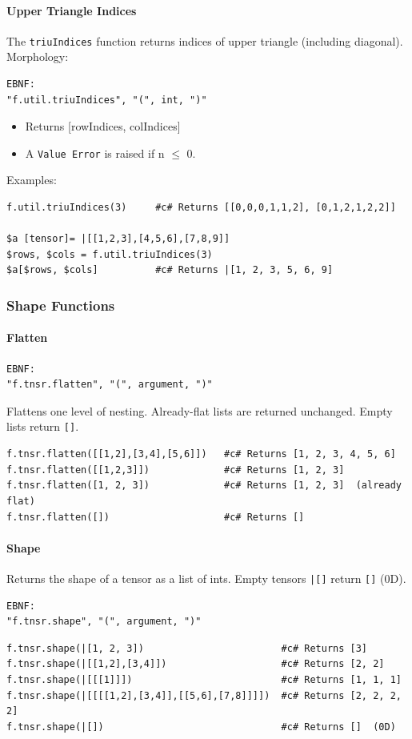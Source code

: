 \paragraph{Upper Triangle Indices}
The \texttt{triuIndices} function returns indices of upper triangle (including diagonal).\\
Morphology:
\begin{verbatim}
EBNF:
"f.util.triuIndices", "(", int, ")"
\end{verbatim}
\begin{itemize}
\item Returns [rowIndices, colIndices]
\item A \texttt{Value Error} is raised if n $\leq$ 0.
\end{itemize}
Examples:
\begin{verbatim}
f.util.triuIndices(3)     #c# Returns [[0,0,0,1,1,2], [0,1,2,1,2,2]]

$a [tensor]= |[[1,2,3],[4,5,6],[7,8,9]]
$rows, $cols = f.util.triuIndices(3)
$a[$rows, $cols]          #c# Returns |[1, 2, 3, 5, 6, 9]
\end{verbatim}

\subsubsection{Shape Functions}
\paragraph{Flatten}
\begin{verbatim}
EBNF:
"f.tnsr.flatten", "(", argument, ")"
\end{verbatim}
Flattens one level of nesting. Already-flat lists are returned unchanged. Empty lists return \texttt{[]}.
\begin{verbatim}
f.tnsr.flatten([[1,2],[3,4],[5,6]])   #c# Returns [1, 2, 3, 4, 5, 6]
f.tnsr.flatten([[1,2,3]])             #c# Returns [1, 2, 3]
f.tnsr.flatten([1, 2, 3])             #c# Returns [1, 2, 3]  (already flat)
f.tnsr.flatten([])                    #c# Returns []
\end{verbatim}

\paragraph{Shape}
Returns the shape of a tensor as a list of ints. Empty tensors \texttt{|[]} return \texttt{[]} (0D).
\begin{verbatim}
EBNF:
"f.tnsr.shape", "(", argument, ")"
\end{verbatim}
\begin{verbatim}
f.tnsr.shape(|[1, 2, 3])                        #c# Returns [3]
f.tnsr.shape(|[[1,2],[3,4]])                    #c# Returns [2, 2]
f.tnsr.shape(|[[[1]]])                          #c# Returns [1, 1, 1]
f.tnsr.shape(|[[[[1,2],[3,4]],[[5,6],[7,8]]]])  #c# Returns [2, 2, 2, 2]
f.tnsr.shape(|[])                               #c# Returns []  (0D)
\end{verbatim}

